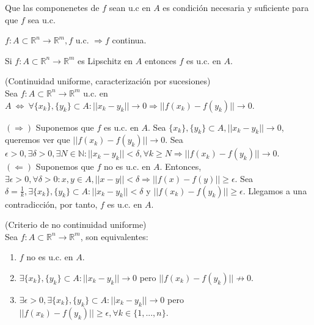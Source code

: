 \begin{obs}
Que las componenetes de $f$ sean u.c en $A$ es condición necesaria y suficiente para que $f$ sea u.c.
\end{obs}

\begin{obs}
$f:A\subset \mathbb{R}^n \rightarrow \mathbb{R}^m, f$ u.c. $\Rightarrow f$ continua.
\end{obs}

\begin{obs}
Si  $f:A\subset \mathbb{R}^n \rightarrow \mathbb{R}^m$ es Lipschitz en $A$ entonces $f$ es u.c. en $A$.
\end{obs}

\begin{prop}(Continuidad uniforme, caracterización por sucesiones)\\
Sea $f:A\subset \mathbb{R}^n \rightarrow \mathbb{R}^m$ u.c. en $A \ \Leftrightarrow \ \forall \{x_k\},\{y_k\}\subset A: ||x_k - y_k|| \rightarrow 0 \Rightarrow ||f(x_k)-f(y_k)|| \rightarrow 0$.
\end{prop}

\begin{dem}
$(\Rightarrow)$ Suponemos que $f$ es u.c. en $A$. Sea $\{x_k\},\{y_k\}\subset A, ||x_k - y_k|| \rightarrow 0$, queremos ver que $||f(x_k)-f(y_k)|| \rightarrow 0$. Sea $\epsilon >0, \exists \delta>0,\exists N \in \mathbb{N}: ||x_k - y_k||<\delta, \forall k \geq N \Rightarrow ||f(x_k)-f(y_k)|| \rightarrow 0$.\\

$(\Leftarrow)$ Suponemos que $f$ no es u.c. en $A$. Entonces, $\exists \epsilon >0, \forall \delta > 0: x,y\in A, ||x-y||<\delta \Rightarrow ||f(x)-f(y)|| \geq \epsilon$. Sea $\delta = \frac{1}{k}, \exists\{x_k\},\{y_k\}\subset A: ||x_k - y_k|| < \delta $ y $ ||f(x_k) - f(y_k)|| \geq \epsilon $. Llegamos a una contradicción, por tanto, $f$ es u.c. en $A$.
\end{dem}

\begin{prop}(Criterio de no continuidad uniforme)\\
Sea $f:A\subset \mathbb{R}^n \rightarrow \mathbb{R}^m$, son equivalentes:
\begin{enumerate}[label=(\roman*)]
    \item $f$ no es u.c. en $A$.
    \item $\exists \{x_k\},\{y_k\}\subset A: ||x_k-y_k|| \rightarrow 0$ pero $||f(x_k)-f(y_k)|| \nrightarrow 0$.
    \item $\exists \epsilon > 0, \exists \{x_k\},\{y_k\}\subset A: ||x_k-y_k|| \rightarrow 0$ pero $||f(x_k)-f(y_k)|| \geq \epsilon, \forall k \in \{1,...,n\}$.
\end{enumerate}
\end{prop}

